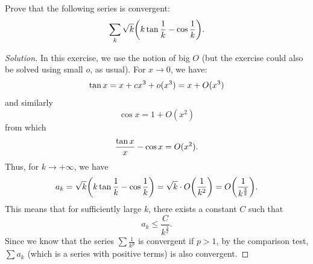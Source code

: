 \begin{exercise}
  Prove that the following series is convergent:
  \[
    \sum_k \sqrt{k} {\left( k\operatorname{tan}{\frac 1 k} - \cos \frac 1 k \right)}.
  \]
\end{exercise}
\begin{proof}[Solution]
In this exercise, we use the notion of big $O$ (but the exercise could also be
solved using small $o$, as usual).
For $x\to 0$, we have: %
\[
  \operatorname{tan} x = x + c x^3 + o(x^3) = x + O(x^3)
\]
and similarly
\[
  \cos x = 1 + O(x^2)
\]
from which
\[
  \frac{\operatorname{tan} x}{x} - \cos x = O(x^2).
\]
Thus, for $k\to +\infty$, we have
\[
  a_k = \sqrt{k} {\left( k\tan{\frac 1 k} - \cos \frac 1 k \right)}
      = \sqrt{k} \cdot O{\left( \frac 1 {k^2} \right)} = O{\left( \frac 1 {k^{\frac 3
   2}} \right)}.
\]
This means that for sufficiently large $k$, there exists a constant $C$
such that
\[
  a_k \le \frac{C}{k^{\frac 3 2}}.
\]
Since we know that the series $\sum \frac{1}{k^p}$ is convergent
if $p>1$, by the comparison test, $\sum a_k$ (which is a series with positive
terms) is also convergent.
\end{proof}